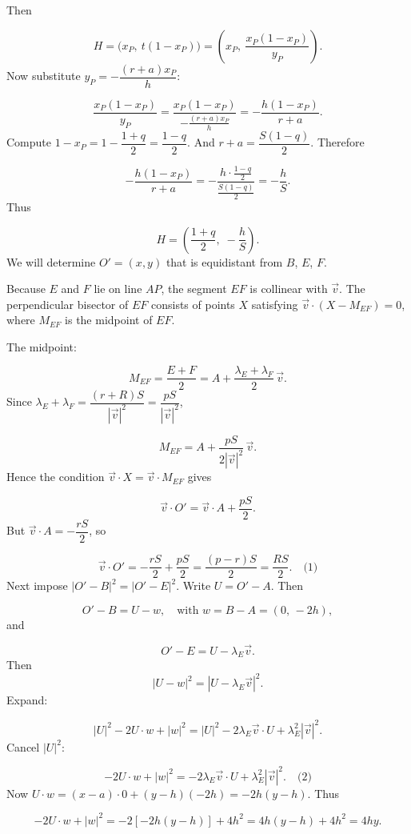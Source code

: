 Then\par
\[
H = \bigl(x_P,\ t(1 - x_P)\bigr) = \left(x_P,\ \frac{x_P(1 - x_P)}{y_P}\right).
\]
Now substitute \(y_P = -\dfrac{(r+a)x_P}{h}\):\par
\[
\frac{x_P(1 - x_P)}{y_P} = \frac{x_P(1 - x_P)}{-\frac{(r+a)x_P}{h}} = -\frac{h(1 - x_P)}{r+a}.
\]
Compute \(1 - x_P = 1 - \dfrac{1+q}{2} = \dfrac{1 - q}{2}\). And \(r + a = \dfrac{S(1 - q)}{2}\). Therefore\par
\[
-\frac{h(1 - x_P)}{r+a} = -\frac{h \cdot \frac{1 - q}{2}}{\frac{S(1 - q)}{2}} = -\frac{h}{S}.
\]
Thus\par
\[
H = \left(\frac{1+q}{2},\; -\frac{h}{S}\right).
\]
We will determine \(O' = (x, y)\) that is equidistant from \(B\), \(E\), \(F\).\par
Because \(E\) and \(F\) lie on line \(AP\), the segment \(EF\) is collinear with \(\vec{v}\). The perpendicular bisector of \(EF\) consists of points \(X\) satisfying \(\vec{v}\cdot (X - M_{EF}) = 0\), where \(M_{EF}\) is the midpoint of \(EF\).\par
The midpoint:\par
\[
M_{EF} = \frac{E+F}{2} = A + \frac{\lambda_E + \lambda_F}{2}\,\vec{v}.
\]
Since \(\lambda_E + \lambda_F = \dfrac{(r+R)S}{|\vec{v}|^2} = \dfrac{p S}{|\vec{v}|^2}\),\par
\[
M_{EF} = A + \frac{p S}{2|\vec{v}|^2}\,\vec{v}.
\]
Hence the condition \(\vec{v}\cdot X = \vec{v}\cdot M_{EF}\) gives\par
\[
\vec{v}\cdot O' = \vec{v}\cdot A + \frac{p S}{2}.
\]
But \(\vec{v}\cdot A = -\dfrac{r S}{2}\), so\par
\[
\vec{v}\cdot O' = -\frac{r S}{2} + \frac{p S}{2} = \frac{(p - r) S}{2} = \frac{R S}{2}. \quad\text{(1)}
\]
Next impose \(|O' - B|^2 = |O' - E|^2\). Write \(U = O' - A\). Then\par
\[
O' - B = U - w,\quad \text{with } w = B - A = (0,\,-2h),
\]
and\par
\[
O' - E = U - \lambda_E \vec{v}.
\]
Then
\[
|U - w|^2 = |U - \lambda_E \vec{v}|^2.
\]
Expand:\par
\[
|U|^2 - 2 U\cdot w + |w|^2 = |U|^2 - 2\lambda_E \vec{v}\cdot U + \lambda_E^2 |\vec{v}|^2.
\]
Cancel \(|U|^2\):\par
\[
-2 U\cdot w + |w|^2 = -2\lambda_E \vec{v}\cdot U + \lambda_E^2 |\vec{v}|^2. \quad\text{(2)}
\]
Now \(U\cdot w = (x - a)\cdot 0 + (y - h)(-2h) = -2h(y - h)\). Thus\par
\[
-2 U\cdot w + |w|^2 = -2[-2h(y - h)] + 4h^2 = 4h(y - h) + 4h^2 = 4h y.
\]
